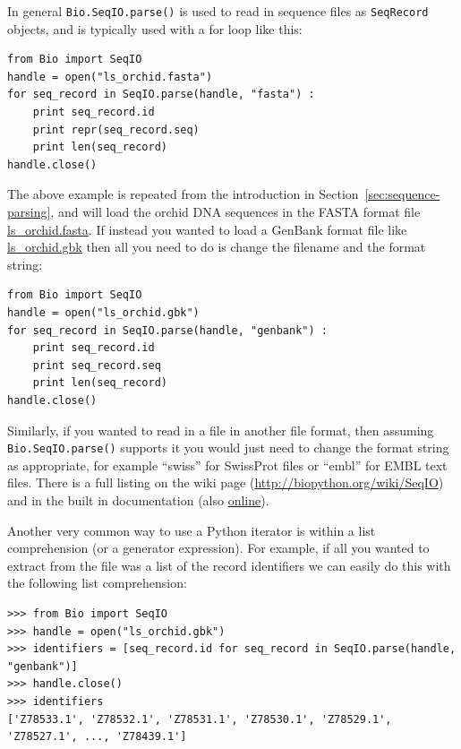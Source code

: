 \documentclass{report}
\begin{document}
In general \verb|Bio.SeqIO.parse()| is used to read in sequence files as \verb|SeqRecord| objects, and is typically used with a for loop like this:

\begin{verbatim}
from Bio import SeqIO
handle = open("ls_orchid.fasta")
for seq_record in SeqIO.parse(handle, "fasta") :
    print seq_record.id
    print repr(seq_record.seq)
    print len(seq_record)
handle.close()
\end{verbatim}

The above example is repeated from the introduction in Section~\ref{sec:sequence-parsing}, and will load the orchid DNA sequences in the FASTA format file \href{http://biopython.org/DIST/docs/tutorial/examples/ls_orchid.fasta}{ls\_orchid.fasta}.  If instead you wanted to load a GenBank format file like \href{http://biopython.org/DIST/docs/tutorial/examples/ls_orchid.gbk}{ls\_orchid.gbk} then all you need to do is change the filename and the format string:

\begin{verbatim}
from Bio import SeqIO
handle = open("ls_orchid.gbk")
for seq_record in SeqIO.parse(handle, "genbank") :
    print seq_record.id
    print seq_record.seq
    print len(seq_record)
handle.close()
\end{verbatim}

Similarly, if you wanted to read in a file in another file format, then assuming \verb|Bio.SeqIO.parse()| supports it you would just need to change the format string as appropriate, for example ``swiss'' for SwissProt files or ``embl'' for EMBL text files. There is a full listing on the wiki page (\url{http://biopython.org/wiki/SeqIO}) and in the built in documentation (also \href{http://biopython.org/DIST/docs/api/Bio.SeqIO-module.html}{online}).

Another very common way to use a Python iterator is within a list comprehension (or
a generator expression).  For example, if all you wanted to extract from the file was
a list of the record identifiers we can easily do this with the following list comprehension:

\begin{verbatim}
>>> from Bio import SeqIO
>>> handle = open("ls_orchid.gbk")
>>> identifiers = [seq_record.id for seq_record in SeqIO.parse(handle, "genbank")]
>>> handle.close()
>>> identifiers
['Z78533.1', 'Z78532.1', 'Z78531.1', 'Z78530.1', 'Z78529.1', 'Z78527.1', ..., 'Z78439.1']
\end{verbatim}
\end{document}
